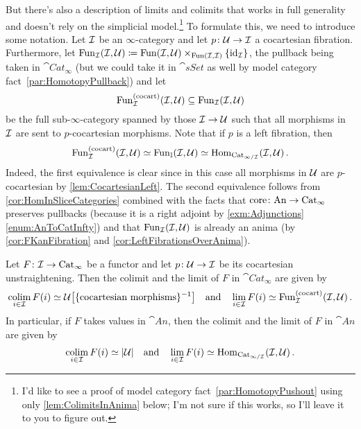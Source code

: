 %	
%
But there's also a description of limits and colimits that works in full generality and doesn't rely on the simplicial model.\footnote{I'd like to see a proof of model category fact~\cref{par:HomotopyPushout} using only \cref{lem:ColimitsInAnima} below; I'm not sure if this works, so I'll leave it to you to figure out.} To formulate this, we need to introduce some notation. Let $\mathcal{I}$ be an $\infty$-category and let $p\colon \mathcal{U}\rightarrow \mathcal{I}$ a cocartesian fibration. Furthermore, let $\operatorname{Fun}_{\mathcal{I}}(\mathcal{I},\mathcal{U})\coloneqq \operatorname{Fun}(\mathcal{I},\mathcal{U})\times_{\operatorname{Fun}(\mathcal{I},\mathcal{I})}\{\operatorname{id}_{\mathcal{I}}\}$, the pullback being taken in $\cat{Cat}_\infty$ (but we could take it in $\cat{sSet}$ as well by model category fact~\cref{par:HomotopyPullback}) and let
\begin{equation*}
	\operatorname{Fun}_{\mathcal{I}}^{(\mathrm{cocart})}(\mathcal{I},\mathcal{U})\subseteq \operatorname{Fun}_{\mathcal{I}}(\mathcal{I},\mathcal{U})
\end{equation*}
be the full sub-$\infty$-category spanned by those $\mathcal{I}\rightarrow \mathcal{U}$ such that all morphisms in $\mathcal{I}$ are sent to $p$-cocartesian morphisms. Note that if $p$ is a left fibration, then
\begin{equation*}
	\operatorname{Fun}_{\mathcal{I}}^{(\mathrm{cocart})}(\mathcal{I},\mathcal{U})\simeq \operatorname{Fun}_{\mathbb{I}}(\mathcal{I},\mathcal{U})\simeq \operatorname{Hom}_{\mathrm{Cat}_{\infty/\mathcal{I}}}(\mathcal{I},\mathcal{U})\,.
\end{equation*}
Indeed, the first equivalence is clear since in this case all morphisms in $\mathcal{U}$ are $p$-cocartesian by \cref{lem:CocartesianLeft}. The second equivalence follows from \cref{cor:HomInSliceCategories} combined with the facts that $\operatorname{core}\colon \mathrm{An}\rightarrow \mathrm{Cat}_\infty$ preserves pullbacks (because it is a right adjoint by \cref{exm:Adjunctions}\cref{enum:AnToCatInfty}) and that $\operatorname{Fun}_{\mathcal{I}}(\mathcal{I},\mathcal{U})$ is already an anima (by \cref{cor:FKanFibration} and \cref{cor:LeftFibrationsOverAnima}).
\begin{lem}\label{lem:ColimitsInAnima}
	Let $F\colon \mathcal{I}\rightarrow \mathrm{Cat}_\infty$ be a functor and let $p\colon \mathcal{U}\rightarrow \mathcal{I}$ be its cocartesian unstraightening. Then the colimit and the limit of $F$ in $\cat{Cat}_\infty$ are given by
	\begin{equation*}
		\colimit_{i\in\Ii}F(i)\simeq \Uu\left[\{\text{cocartesian morphisms}\}^{-1}\right]\quad\text{and}\quad
		\limit_{i\in\Ii}F(i)\simeq \Fun_\Ii^{(\mathrm{cocart})}(\Ii,\Uu)\,.
	\end{equation*}
	In particular, if $F$ takes values in $\cat{An}$, then the colimit and the limit of $F$ in $\cat{An}$ are given by
	\begin{equation*}
		\colimit_{i\in\Ii}F(i)\simeq \abs*{\Uu}\quad\text{and}\quad \limit_{i\in\Ii}F(i)\simeq \Hom_{\Cat_{\infty/\Ii}}(\Ii,\Uu)\,.
	\end{equation*}
\end{lem}
